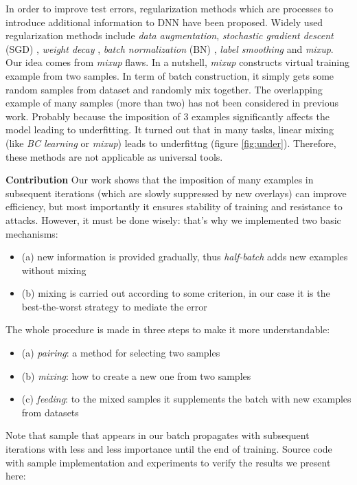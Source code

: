 \documentclass{article}
\begin{document}
In order to improve test errors, regularization methods which are processes to
introduce additional information to DNN have been proposed\cite{miyato2018virtual}. Widely
used regularization methods include \emph{data augmentation}, \emph{stochastic
	gradient descent} (SGD) \cite{zhang2016understanding}, \emph{weight decay}
\cite{krogh1992simple}, \emph{batch normalization} (BN) \cite{ioffe2015batch},
\emph{label
	smoothing}\cite{szegedy2016rethinking} and \emph{mixup}\cite{zhang2017mixup}.
%
Our idea comes from \emph{mixup} flaws. In a nutshell, \emph{mixup} constructs
virtual training example from two samples. In term of batch construction, it
simply gets some random samples from dataset and randomly mix together.
%
The overlapping example of many samples (more than two) has not been considered
in previous work. Probably because the imposition of 3 examples significantly affects the model leading to underfitting.
%
It turned out that in many tasks, linear mixing (like \emph{BC learning} or
\emph{mixup}) leads to underfittng (figure \ref{fig:under}). Therefore, these methods are not applicable as universal tools.

\textbf{Contribution} Our work shows that the imposition of many examples in
subsequent iterations (which are slowly suppressed by new overlays) can improve efficiency, but most importantly it ensures stability of training and resistance to attacks.
%
However, it must be done wisely: that's why we implemented two basic mechanisms:
\begin{itemize}
\item (a) new information is provided gradually, thus \emph{half-batch} adds
new examples without mixing
\item (b) mixing is carried out according to some criterion, in our case it is the
best-the-worst strategy to mediate the error
\end{itemize}
%
The whole procedure is made in three steps to make it more understandable:
\begin{itemize}
\item (a) \emph{pairing}: a method for selecting two samples
\item (b) \emph{mixing}: how to create a new one from two samples
\item (c) \emph{feeding}: to the mixed samples it supplements the batch with new examples
from datasets
\end{itemize}
%
Note that sample that appears in our batch propagates with
subsequent iterations with less and less importance until the end of training.
%
Source code with sample implementation and experiments to verify the results
we present here:
\end{document}
